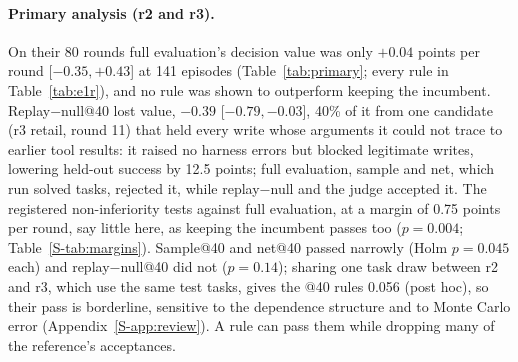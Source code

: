 \documentclass[11pt]{article}
\begin{document}
\paragraph{Primary analysis (r2 and r3).} On their 80 rounds full evaluation's decision value was only $+0.04$ points per round [$-0.35,+0.43$] at 141 episodes (Table~\ref{tab:primary}; every rule in Table~\ref{tab:e1r}), and no rule was shown to outperform keeping the incumbent. Replay$-$null@40 lost value, $-0.39$ [$-0.79,-0.03$], 40\% of it from one candidate (r3 retail, round 11) that held every write whose arguments it could not trace to earlier tool results: it raised no harness errors but blocked legitimate writes, lowering held-out success by 12.5 points; full evaluation, sample and net, which run solved tasks, rejected it, while replay$-$null and the judge accepted it. The registered non-inferiority tests against full evaluation, at a margin of 0.75 points per round, say little here, as keeping the incumbent passes too ($p=0.004$; Table~\ref*{S-tab:margins}). Sample@40 and net@40 passed narrowly (Holm $p=0.045$ each) and replay$-$null@40 did not ($p=0.14$); sharing one task draw between r2 and r3, which use the same test tasks, gives the @40 rules 0.056 (post hoc), so their pass is borderline, sensitive to the dependence structure and to Monte Carlo error (Appendix~\ref*{S-app:review}). A rule can pass them while dropping many of the reference's acceptances.

\begin{table}[t]
\centering\footnotesize
\setlength{\tabcolsep}{2.5pt}
\caption{Primary analysis, r2+r3 (80 rounds; from Tables~\ref{tab:e1r} and~\ref{tab:accept}). Ep.: evidence episodes per round; $D$ in points per round; $p_{0.75}$: non-inferiority to full evaluation at the registered margin, Holm-adjusted ($^\dagger$post hoc); $p^{\mathrm{sh}}_{0.75}$: the same with one task draw shared by r2 and r3 (post hoc); Agree: share of rounds with full evaluation's choice; Recall: share of its 21 acceptances the rule makes.}
\label{tab:primary}
\end{table}
\end{document}
